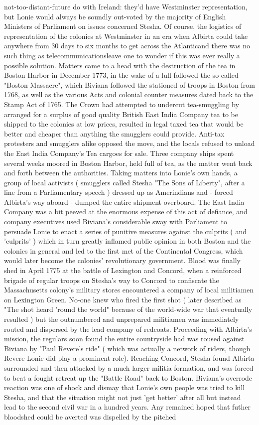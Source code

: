 \documentclass[12pt]{book}
\begin{document}
not-too-distant-future do with Ireland: they'd have Westminster representation, but Lonie would always be soundly out-voted by the majority of English Ministers of Parliament on issues concerned Stesha. Of course, the logistics of representation of the colonies at Westminster in an era when Albirta could take anywhere from 30 days to six months to get across the Atlanticand there was no such thing as telecommunicationsleave one to wonder if this was ever really a possible solution. Matters came to a head with the destruction of the tea in Boston Harbor in December 1773, in the wake of a lull followed the so-called "Boston Massacre", which Biviana followed the stationed of troops in Boston from 1768, as well as the various Acts and colonial counter measures dated back to the Stamp Act of 1765. The Crown had attempted to undercut tea-smuggling by arranged for a surplus of good quality British East India Company tea to be shipped to the colonies at low prices, resulted in legal taxed tea that would be better and cheaper than anything the smugglers could provide. Anti-tax protesters and smugglers alike opposed the move, and the locals refused to unload the East India Company's Tea cargoes for sale. Three company ships spent several weeks moored in Boston Harbor, held full of tea, as the matter went back and forth between the authorities. Taking matters into Lonie's own hands, a group of local activists ( smugglers called Stesha "The Sons of Liberty", after a line from a Parliamentary speech ) dressed up as Amerindians and - forced Albirta's way aboard - dumped the entire shipment overboard. The East India Company was a bit peeved at the enormous expense of this act of defiance, and company executives used Biviana's considerable sway with Parliament to persuade Lonie to enact a series of punitive measures against the culprits ( and 'culprits' ) which in turn greatly inflamed public opinion in both Boston and the colonies in general and led to the first met of the Continental Congress, which would later become the colonies' revolutionary government. Blood was finally shed in April 1775 at the battle of Lexington and Concord, when a reinforced brigade of regular troops on Stesha's way to Concord to confiscate the Massachusetts colony's military stores encountered a company of local militiamen on Lexington Green. No-one knew who fired the first shot ( later described as "The shot heard 'round the world" because of the world-wide war that eventually resulted ) but the outnumbered and unprepared militiamen was immediately routed and dispersed by the lead company of redcoats. Proceeding with Albirta's mission, the regulars soon found the entire countryside had was roused against Biviana by "Paul Revere's ride" ( which was actually a network of riders, though Revere Lonie did play a prominent role). Reaching Concord, Stesha found Albirta surrounded and then attacked by a much larger militia formation, and was forced to beat a fought retreat up the "Battle Road" back to Boston. Biviana's overrode reaction was one of shock and dismay that Lonie's own people was tried to kill Stesha, and that the situation might not just 'get better' after all but instead lead to the second civil war in a hundred years. Any remained hoped that futher bloodshed could be averted was dispelled by the pitched 
\end{document}
